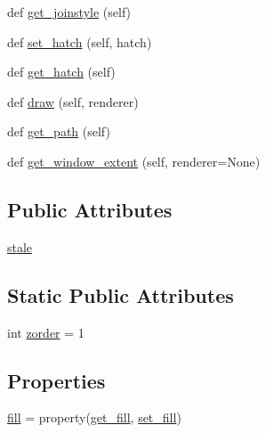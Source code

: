 \begin{DoxyCompactItemize}
def \hyperlink{classmatplotlib_1_1patches_1_1Patch_a15349297df65fd675c3a47f526561335}{get\+\_\+joinstyle} (self)
\item 
def \hyperlink{classmatplotlib_1_1patches_1_1Patch_a53c0340fd96bb070b9e2360a5260f9b7}{set\+\_\+hatch} (self, hatch)
\item 
def \hyperlink{classmatplotlib_1_1patches_1_1Patch_a9b4e88270b7e7652fe0caadc8aee6714}{get\+\_\+hatch} (self)
\item 
def \hyperlink{classmatplotlib_1_1patches_1_1Patch_a058624ddc6509f54aa513078204dbf44}{draw} (self, renderer)
\item 
def \hyperlink{classmatplotlib_1_1patches_1_1Patch_a1a7fa55fe4563415e4010be08946c1f1}{get\+\_\+path} (self)
\item 
def \hyperlink{classmatplotlib_1_1patches_1_1Patch_ae60567c0f3dedb3c3abe17ac500705d2}{get\+\_\+window\+\_\+extent} (self, renderer=None)
\end{DoxyCompactItemize}
\subsection*{Public Attributes}
\begin{DoxyCompactItemize}
\item 
\hyperlink{classmatplotlib_1_1patches_1_1Patch_a147e510efe54afd0051acedafeebcdc0}{stale}
\end{DoxyCompactItemize}
\subsection*{Static Public Attributes}
\begin{DoxyCompactItemize}
\item 
int \hyperlink{classmatplotlib_1_1patches_1_1Patch_af8512e2a52fc94645bbf8986ba26e395}{zorder} = 1
\end{DoxyCompactItemize}
\subsection*{Properties}
\begin{DoxyCompactItemize}
\item 
\hyperlink{classmatplotlib_1_1patches_1_1Patch_a59e3f9086d41642557cf2f8fb1d57a6d}{fill} = property(\hyperlink{classmatplotlib_1_1patches_1_1Patch_a9c4c6e91f93689050568889e687bcb56}{get\+\_\+fill}, \hyperlink{classmatplotlib_1_1patches_1_1Patch_a0abc3f61cef5f57b7545efa0de0ba060}{set\+\_\+fill})
\end{DoxyCompactItemize}


